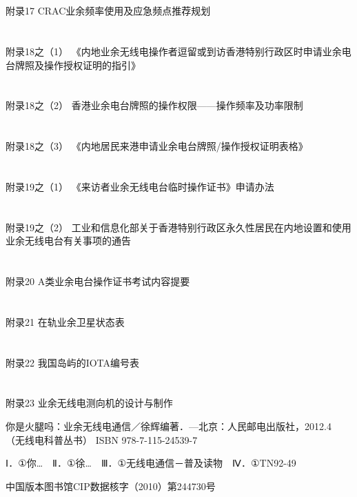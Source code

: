 \documentclass[12pt,UTF8]{ctexbook}
\begin{document}
\section{}附录17 CRAC业余频率使用及应急频点推荐规划
\section{}附录18之（1） 《内地业余无线电操作者逗留或到访香港特别行政区时申请业余电台牌照及操作授权证明的指引》
\section{}附录18之（2） 香港业余电台牌照的操作权限——操作频率及功率限制
\section{}附录18之（3） 《内地居民来港申请业余电台牌照/操作授权证明表格》
\section{}附录19之（1） 《来访者业余无线电台临时操作证书》申请办法
\section{}附录19之（2） 工业和信息化部关于香港特别行政区永久性居民在内地设置和使用业余无线电台有关事项的通告
\section{}附录20 A类业余电台操作证书考试内容提要
\section{}附录21 在轨业余卫星状态表
\section{}附录22 我国岛屿的IOTA编号表
\section{}附录23 业余无线电测向机的设计与制作


你是火腿吗：业余无线电通信／徐辉编著．—北京：人民邮电出版社，2012.4
（无线电科普丛书）
ISBN 978-7-115-24539-7

Ⅰ．①你…　Ⅱ．①徐…　Ⅲ．①无线电通信－普及读物　Ⅳ．①TN92-49

中国版本图书馆CIP数据核字（2010）第244730号
\end{document}
